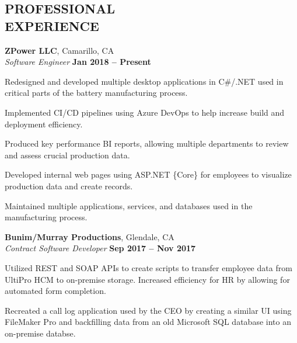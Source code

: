 \documentclass[margin,line,11pt]{resume}
\begin{document}
\begin{resume}
    \section{\mysidestyle \textbf{\large{P}\small{ROFESSIONAL\\EXPERIENCE}}}

    \textbf{\listing ZPower LLC}, Camarillo, CA \vspace{2mm}\\\vspace{1mm}
    \textsl{Software Engineer} \hfill \textbf{Jan 2018 -- Present}\\
    \begin{list2}
        \item Redesigned and developed multiple desktop applications in C\#/.NET used in critical parts of the battery manufacturing process.
        \item Implemented CI/CD pipelines using Azure DevOps to help increase build and deployment efficiency.
        \item Produced key performance BI reports, allowing multiple departments to review and assess crucial production data.
        \item Developed internal web pages using ASP.NET \{Core\} for employees to visualize production data and create records.
        \item Maintained multiple applications, services, and databases used in the manufacturing process.
    \end{list2}

    \textbf{\listing Bunim/Murray Productions}, Glendale, CA \vspace{2mm}\\\vspace{1mm}
    \textsl{Contract Software Developer} \hfill \textbf{Sep 2017 -- Nov 2017}\\
    \begin{list2}
        \item Utilized REST and SOAP APIs to create scripts to transfer employee data from UltiPro HCM to on-premise storage. Increased efficiency for HR by allowing for automated form completion.
        \item Recreated a call log application used by the CEO by creating a similar UI using FileMaker Pro and backfilling data from an old Microsoft SQL database into an on-premise databse.
    \end{list2}
    

\sectionline


\end{resume}
\end{document}
